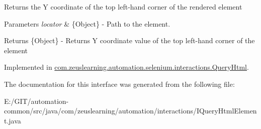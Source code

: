 Returns the Y coordinate of the top left-\/hand corner of the rendered element


\begin{DoxyParams}{Parameters}
{\em locator} & \{Object\} -\/ Path to the element. \\
\hline
\end{DoxyParams}
\begin{DoxyReturn}{Returns}
\{Object\} -\/ Returns Y coordinate value of the top left-\/hand corner of the element 
\end{DoxyReturn}


Implemented in \hyperlink{classcom_1_1zeuslearning_1_1automation_1_1selenium_1_1interactions_1_1QueryHtml_a3809f347197437c4f02974ac8a69637d}{com.\+zeuslearning.\+automation.\+selenium.\+interactions.\+Query\+Html}.



The documentation for this interface was generated from the following file\+:\begin{DoxyCompactItemize}
\item 
E\+:/\+G\+I\+T/automation-\/common/src/java/com/zeuslearning/automation/interactions/I\+Query\+Html\+Element.\+java\end{DoxyCompactItemize}
